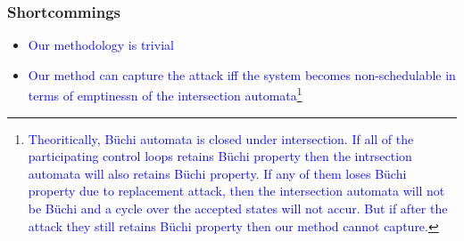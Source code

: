 \begin{frame}
\frametitle{ Shortcommings}

\begin{itemize}
 \item \tiny{\textcolor{blue}{Our methodology is trivial}}
 \item \tiny{\textcolor{blue}{Our method can capture the attack iff the system becomes non-schedulable
       in terms of emptinessn of the intersection automata\footnote{ \tiny{\textcolor{blue}{Theoritically, B\"{u}chi automata is closed under intersection. If all of the participating
       control loops retains B\"{u}chi property then the intrsection automata will also retains B\"{u}chi 
       property. If any of them loses B\"{u}chi property due to replacement attack, then the intersection
       automata will not be B\"{u}chi and a cycle over the accepted states will not accur. But if after the attack
       they still retains B\"{u}chi property then our method cannot capture.}}}}}

       
\end{itemize}

\end{frame}
